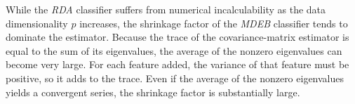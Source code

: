 \documentclass[11pt]{article}
\begin{document}
While the \emph{RDA} classifier suffers from numerical incalculability as the data dimensionality $p$ increases, the shrinkage factor of the \emph{MDEB} classifier tends to dominate the estimator. Because the trace of the covariance-matrix estimator is equal to the sum of its eigenvalues, the average of the nonzero eigenvalues can become very large. For each feature added, the variance of that feature must be positive, so it adds to the trace.  Even if the average of the nonzero eigenvalues yields a convergent series, the shrinkage factor is substantially large.


	



\end{document}
